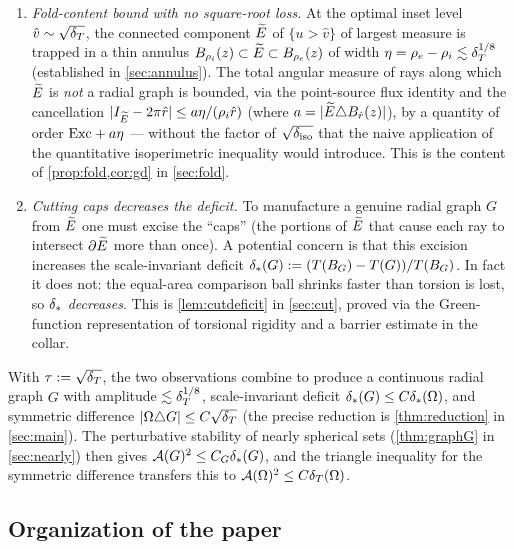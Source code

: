 \begin{enumerate}
\item \emph{Fold-content bound with no square-root loss.}
  At the optimal inset level $\hat v\sim\sqrt{\delta_T}$, the connected
  component $\widetilde{E}$ of $\{u>\hat v\}$ of largest measure is trapped in a
  thin annulus $B_{\rho_i}(z)\subset\widetilde{E}\subset B_{\rho_e}(z)$ of
  width $\eta=\rho_e-\rho_i\lesssim\delta_T^{1/8}$ (established in
  \cref{sec:annulus}).  The total angular measure of rays along which
  $\widetilde{E}$ is \emph{not} a radial graph is bounded, via the
  point-source flux identity and the cancellation
  $|I_{\widetilde{E}}-2\pi\hat r|\le a\eta/(\rho_i\hat r)$
  (where $a=|\widetilde{E}\triangle B_{\hat r}(z)|$), by a quantity of order
  $\mathrm{Exc}+a\eta$ — without the factor of $\sqrt{\delta_{\mathrm{iso}}}$ that the
  naive application of the quantitative isoperimetric inequality
  \cite{FMP2008} would introduce.  This is the content of
  \cref{prop:fold,cor:gd} in \cref{sec:fold}.

\item \emph{Cutting caps decreases the deficit.}
  To manufacture a genuine radial graph $G$ from $\widetilde{E}$ one must excise
  the ``caps'' (the portions of $\widetilde{E}$ that cause each ray to intersect
  $\partial\widetilde{E}$ more than once).  A potential concern is that this
  excision increases the scale-invariant deficit
  $\delta_{*}(G):=(T(B_G)-T(G))/T(B_G)$.  In fact it does not: the
  equal-area comparison ball shrinks faster than torsion is lost, so
  $\delta_{*}$ \emph{decreases}.  This is \cref{lem:cutdeficit} in
  \cref{sec:cut}, proved via the Green-function representation of
  torsional rigidity and a barrier estimate in the collar.
\end{enumerate}

With $\tau:=\sqrt{\delta_T}$, the two observations combine to produce a
continuous radial graph $G$ with amplitude $\lesssim\delta_T^{1/8}$,
scale-invariant deficit $\delta_{*}(G)\le C\delta_{*}(\Omega)$, and symmetric
difference $|\Omega\triangle G|\le C\sqrt{\delta_T}$ (the precise reduction
is \cref{thm:reduction} in \cref{sec:main}).  The
perturbative stability of nearly spherical sets
(\cref{thm:graphG} in \cref{sec:nearly}) then gives $\mathcal{A}(G)^2\le C_G\delta_{*}(G)$,
and the triangle inequality for the symmetric difference transfers this
to $\mathcal{A}(\Omega)^2\le C\delta_T(\Omega)$.

\subsection*{Organization of the paper}

